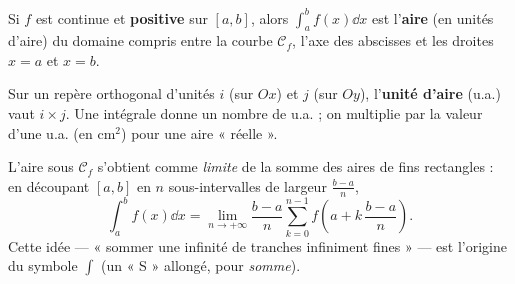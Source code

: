 \begin{theoreme}
Si $f$ est continue et \textbf{positive} sur $[a,b]$, alors $\displaystyle\int_a^b f(x)\dd x$ est l'\textbf{aire}
(en unités d'aire) du domaine compris entre la courbe $\mathcal C_f$, l'axe des abscisses et les
droites $x=a$ et $x=b$.
\end{theoreme}

\begin{illus}
\end{illus}

\begin{remarque}
Sur un repère orthogonal d'unités $i$ (sur $Ox$) et $j$ (sur $Oy$), l'\textbf{unité d'aire} (u.a.)
vaut $i\times j$. Une intégrale donne un nombre de u.a. ; on multiplie par la valeur d'une u.a.
(en cm$^2$) pour une aire « réelle ».
\end{remarque}

\begin{remarque}
L'aire sous $\mathcal C_f$ s'obtient comme \emph{limite} de la somme des aires de fins rectangles :
en découpant $[a,b]$ en $n$ sous-intervalles de largeur $\frac{b-a}{n}$,
\[
\int_a^b f(x)\dd x=\lim_{n\to+\infty}\frac{b-a}{n}\sum_{k=0}^{n-1} f\!\left(a+k\,\frac{b-a}{n}\right).
\]
Cette idée — « sommer une infinité de tranches infiniment fines » — est l'origine du symbole
$\int$ (un « S » allongé, pour \emph{somme}).
\end{remarque}

